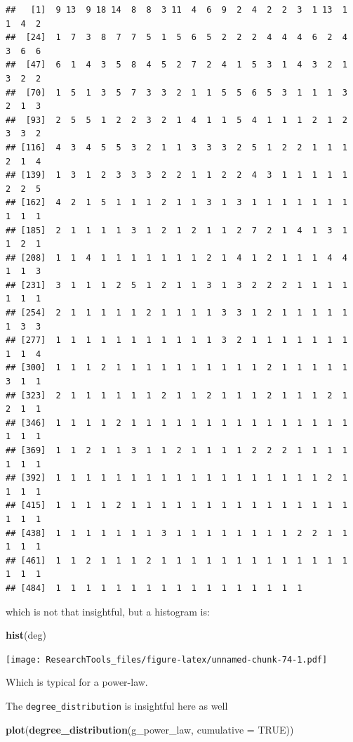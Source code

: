 \documentclass[]{article}
\newenvironment{Shaded}{\begin{snugshade}}{\end{snugshade}}
\newcommand{\KeywordTok}[1]{\textcolor[rgb]{0.13,0.29,0.53}{\textbf{#1}}}
\newcommand{\DataTypeTok}[1]{\textcolor[rgb]{0.13,0.29,0.53}{#1}}
\newcommand{\OtherTok}[1]{\textcolor[rgb]{0.56,0.35,0.01}{#1}}
\newcommand{\NormalTok}[1]{#1}
\theoremstyle{definition}
\theoremstyle{definition}
\theoremstyle{definition}
\theoremstyle{remark}
\begin{document}
\begin{verbatim}
##   [1]  9 13  9 18 14  8  8  3 11  4  6  9  2  4  2  2  3  1 13  1  1  4  2
##  [24]  1  7  3  8  7  7  5  1  5  6  5  2  2  2  4  4  4  6  2  4  3  6  6
##  [47]  6  1  4  3  5  8  4  5  2  7  2  4  1  5  3  1  4  3  2  1  3  2  2
##  [70]  1  5  1  3  5  7  3  3  2  1  1  5  5  6  5  3  1  1  1  3  2  1  3
##  [93]  2  5  5  1  2  2  3  2  1  4  1  1  5  4  1  1  1  2  1  2  3  3  2
## [116]  4  3  4  5  5  3  2  1  1  3  3  3  2  5  1  2  2  1  1  1  2  1  4
## [139]  1  3  1  2  3  3  3  2  2  1  1  2  2  4  3  1  1  1  1  1  2  2  5
## [162]  4  2  1  5  1  1  1  2  1  1  3  1  3  1  1  1  1  1  1  1  1  1  1
## [185]  2  1  1  1  1  3  1  2  1  2  1  1  2  7  2  1  4  1  3  1  1  2  1
## [208]  1  1  4  1  1  1  1  1  1  1  2  1  4  1  2  1  1  1  4  4  1  1  3
## [231]  3  1  1  1  2  5  1  2  1  1  3  1  3  2  2  2  1  1  1  1  1  1  1
## [254]  2  1  1  1  1  1  2  1  1  1  1  3  3  1  2  1  1  1  1  1  1  3  3
## [277]  1  1  1  1  1  1  1  1  1  1  1  3  2  1  1  1  1  1  1  1  1  1  4
## [300]  1  1  1  2  1  1  1  1  1  1  1  1  1  1  2  1  1  1  1  1  3  1  1
## [323]  2  1  1  1  1  1  1  2  1  1  2  1  1  1  2  1  1  1  2  1  2  1  1
## [346]  1  1  1  1  2  1  1  1  1  1  1  1  1  1  1  1  1  1  1  1  1  1  1
## [369]  1  1  2  1  1  3  1  1  2  1  1  1  1  2  2  2  1  1  1  1  1  1  1
## [392]  1  1  1  1  1  1  1  1  1  1  1  1  1  1  1  1  1  1  2  1  1  1  1
## [415]  1  1  1  1  2  1  1  1  1  1  1  1  1  1  1  1  1  1  1  1  1  1  1
## [438]  1  1  1  1  1  1  1  3  1  1  1  1  1  1  1  1  2  2  1  1  1  1  1
## [461]  1  1  2  1  1  1  2  1  1  1  1  1  1  1  1  1  1  1  1  1  1  1  1
## [484]  1  1  1  1  1  1  1  1  1  1  1  1  1  1  1  1  1
\end{verbatim}

which is not that insightful, but a histogram is:

\begin{Shaded}
\begin{Highlighting}[]
 \KeywordTok{hist}\NormalTok{(deg)}
\end{Highlighting}
\end{Shaded}

\texttt{[image: ResearchTools\_files/figure-latex/unnamed-chunk-74-1.pdf]}

Which is typical for a power-law.

The \texttt{degree\_distribution} is insightful here as well

\begin{Shaded}
\begin{Highlighting}[]
\KeywordTok{plot}\NormalTok{(}\KeywordTok{degree_distribution}\NormalTok{(g_power_law, }\DataTypeTok{cumulative =} \OtherTok{TRUE}\NormalTok{))}
\end{Highlighting}
\end{Shaded}
\end{document}
